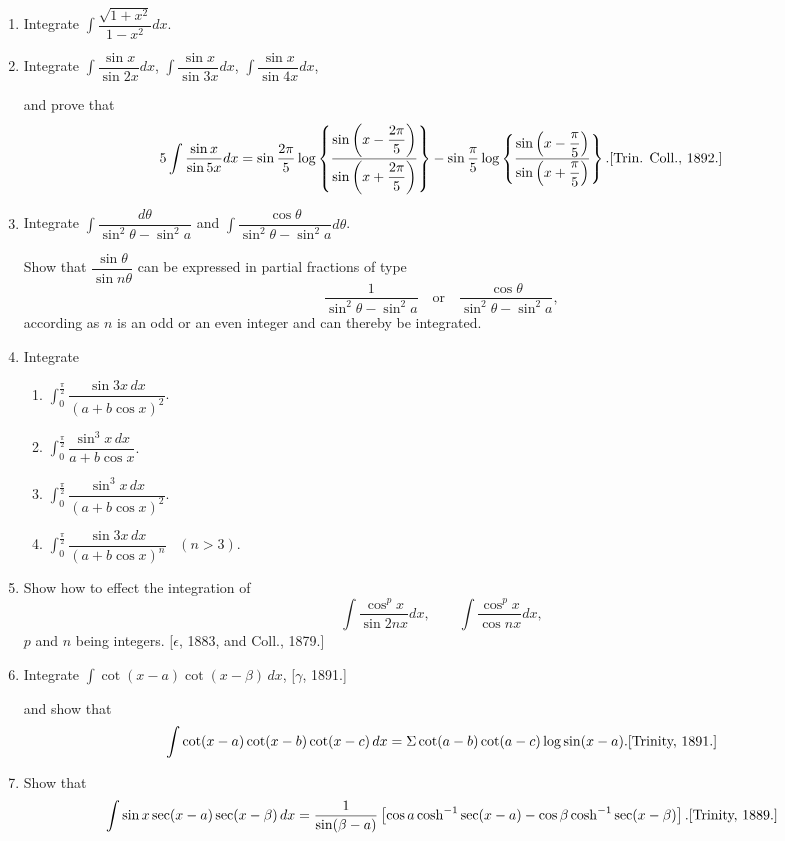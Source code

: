 \documentclass[11pt, a4paper]{article}
\newcommand{\source}[1]{\hfill\textnormal{[#1]}}
\begin{document}
\begin{enumerate}[leftmargin=2em]
\item Integrate $\displaystyle\int \dfrac{\sqrt{1+x^2}}{1-x^2}dx$.

\item Integrate $\displaystyle\int \dfrac{\sin x}{\sin 2x}dx$, $\displaystyle\int \dfrac{\sin x}{\sin 3x}dx$, $\displaystyle\int \dfrac{\sin x}{\sin 4x}dx$,

and prove that
\[
5\int \dfrac{\sin x}{\sin 5x}dx = \sin\dfrac{2\pi}{5}\log\left\{\dfrac{\sin\left(x-\dfrac{2\pi}{5}\right)}{\sin\left(x+\dfrac{2\pi}{5}\right)}\right\} - \sin\dfrac\pi5\log\left\{\dfrac{\sin\left(x-\dfrac\pi5\right)}{\sin\left(x+\dfrac\pi5\right)}\right\}. \source{Trin. Coll., 1892.}
\]

\item Integrate $\displaystyle\int \dfrac{d\theta}{\sin^2\theta-\sin^2a}$ and $\displaystyle\int \dfrac{\cos\theta}{\sin^2\theta-\sin^2a}d\theta$.

Show that $\dfrac{\sin\theta}{\sin n\theta}$ can be expressed in partial fractions of type
\[
\dfrac{1}{\sin^2\theta-\sin^2a} \quad\text{or}\quad \dfrac{\cos\theta}{\sin^2\theta-\sin^2a},
\]
according as $n$ is an odd or an even integer and can thereby be integrated.

\item Integrate
\begin{enumerate}[label=(\roman*)]
\item $\displaystyle\int_0^{\frac\pi2} \dfrac{\sin3x\,dx}{(a+b\cos x)^2}$.
\item $\displaystyle\int_0^{\frac\pi2} \dfrac{\sin^3x\,dx}{a+b\cos x}$.
\item $\displaystyle\int_0^{\frac\pi2} \dfrac{\sin^3x\,dx}{(a+b\cos x)^2}$.
\item $\displaystyle\int_0^{\frac\pi2} \dfrac{\sin3x\,dx}{(a+b\cos x)^n}$ \ $(n>3)$.
\end{enumerate}

\item Show how to effect the integration of
\[
\int \dfrac{\cos^px}{\sin2nx}dx, \qquad \int \dfrac{\cos^px}{\cos nx}dx,
\]
$p$ and $n$ being integers. \source{$\epsilon$, 1883, and Coll., 1879.}

\item Integrate $\displaystyle\int \cot(x-a)\cot(x-\beta)\,dx$, \source{$\gamma$, 1891.}

and show that
\[
\int \cot(x-a)\cot(x-b)\cot(x-c)\,dx = \Sigma\cot(a-b)\cot(a-c)\log\sin(x-a). \source{Trinity, 1891.}
\]

\item Show that
\[
\int \sin x\sec(x-a)\sec(x-\beta)\,dx = \dfrac{1}{\sin(\beta-a)}\left[\cos a\cosh^{-1}\sec(x-a)-\cos\beta\cosh^{-1}\sec(x-\beta)\right]. \source{Trinity, 1889.}
\]


\end{enumerate}
\end{document}
